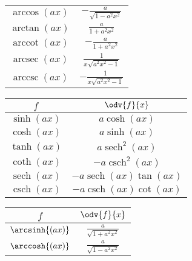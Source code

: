 \documentclass{article}
\DeclareMathOperator{\sech}{sech}
\DeclareMathOperator{\csch}{csch}
\DeclareMathOperator{\arccot}{arccot}
\DeclareMathOperator{\arcsec}{arcsec}
\DeclareMathOperator{\arccsc}{arccsc}
\begin{document}
\begin{appendix}
\begin{table}[H]
\begin{tabular}{c c}
            \(\arccos{\left( ax \right)}\) & \(\displaystyle -\frac{a}{\sqrt{1-a^2x^2}}\)    \\[8pt]
            \(\arctan{\left( ax \right)}\) & \(\displaystyle  \frac{a}{1+a^2x^2}\)           \\[8pt]
            \(\arccot{\left( ax \right)}\) & \(\displaystyle -\frac{a}{1+a^2x^2}\)           \\[8pt]
            \(\arcsec{\left( ax \right)}\) & \(\displaystyle  \frac{1}{x\sqrt{a^2x^2 - 1}}\) \\[8pt]
            \(\arccsc{\left( ax \right)}\) & \(\displaystyle -\frac{1}{x\sqrt{a^2x^2 - 1}}\) \\[8pt]
            \bottomrule
        \end{tabular}
    \end{table}
    \begin{table}[H]
        \renewcommand*{\arraystretch}{1.5}
        \centering
        \hspace*{-1cm}
        \begin{tabular}{c c}
            \toprule
            \(f\)                        & \(\odv{f}{x}\)                                        \\
            \midrule
            \(\sinh{\left( ax \right)}\) & \(a\cosh{\left( ax \right)}\)                         \\
            \(\cosh{\left( ax \right)}\) & \(a\sinh{\left( ax \right)}\)                         \\
            \(\tanh{\left( ax \right)}\) & \(a\sech^2{\left( ax \right)}\)                       \\
            \(\coth{\left( ax \right)}\) & \(-a\csch^2{\left( ax \right)}\)                      \\
            \(\sech{\left( ax \right)}\) & \(-a\sech{\left( ax \right)}\tan{\left( ax \right)}\) \\
            \(\csch{\left( ax \right)}\) & \(-a\csch{\left( ax \right)}\cot{\left( ax \right)}\) \\[5pt]
            \bottomrule
        \end{tabular}
        \begin{tabular}{c c}
            \toprule
            \(f\)                           & \(\odv{f}{x}\)                              \\
            \midrule
            \(\arcsinh{\left( ax \right)}\) & \(\displaystyle \frac{a}{\sqrt{1+a^2x^2}}\) \\[8pt]
            \(\arccosh{\left( ax \right)}\) & \(\displaystyle \frac{a}{\sqrt{1-a^2x^2}}\) \\[8pt]

\end{tabular}
\end{table}
\end{appendix}
\end{document}
